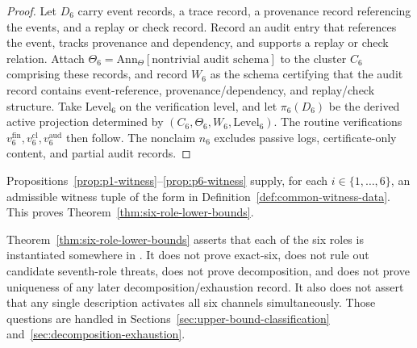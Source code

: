 \begin{proof}
Let \(D_6\) carry event records, a trace record, a provenance record
referencing the events, and a replay or check record. Record an audit
entry that references the event, tracks provenance and dependency, and
supports a replay or check relation. Attach
\(\Theta_6 = \mathrm{Ann}_\Theta[\text{nontrivial audit schema}]\) to
the cluster \(C_6\) comprising these records, and record \(W_6\) as the
schema certifying that
the audit record contains event-reference, provenance/dependency, and
replay/check structure. Take \(\mathrm{Level}_6\) on the verification
level, and let \(\pi_6(D_6)\) be the derived active projection
determined by \((C_6,\Theta_6,W_6,\mathrm{Level}_6)\). The routine
verifications \(v_6^{\mathrm{fin}}, v_6^{\mathrm{cl}},
v_6^{\mathrm{aud}}\) then follow. The nonclaim \(n_6\) excludes passive
logs, certificate-only content, and partial audit records.
\end{proof}

Propositions~\ref{prop:p1-witness}--\ref{prop:p6-witness} supply, for
each \(i \in \{1,\ldots,6\}\), an admissible witness tuple of the
form in Definition~\ref{def:common-witness-data}. This proves
Theorem~\ref{thm:six-role-lower-bounds}.

\begin{remark}\label{rem:lower-bounds-scope}
Theorem~\ref{thm:six-role-lower-bounds} asserts that each of the six
roles is instantiated somewhere in \FATCD{}. It does not prove
exact-six, does not rule out candidate seventh-role threats, does not
prove decomposition, and does not prove uniqueness of any later
decomposition/exhaustion record. It also does not assert that any
single description activates all six channels simultaneously. Those
questions are handled in
Sections~\ref{sec:upper-bound-classification}
and~\ref{sec:decomposition-exhaustion}.
\end{remark}
